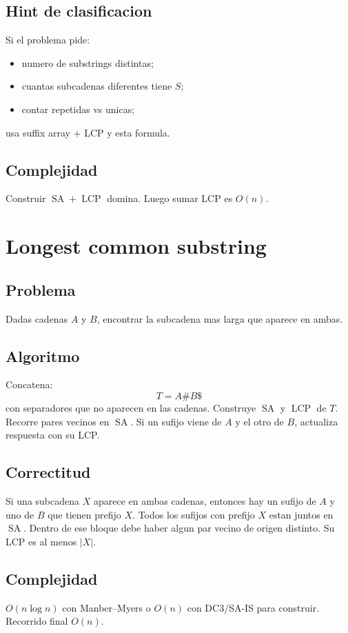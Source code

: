 \documentclass[10pt]{article}
\newcommand{\bigO}{O}
\newcommand{\SA}{\operatorname{SA}}
\newcommand{\LCP}{\operatorname{LCP}}
\begin{document}
\subsection{Hint de clasificacion}
Si el problema pide:
\begin{itemize}[leftmargin=*]
\item numero de substrings distintas;
\item cuantas subcadenas diferentes tiene $S$;
\item contar repetidas vs unicas;
\end{itemize}
usa suffix array + LCP y esta formula.

\subsection{Complejidad}
Construir $\SA+\LCP$ domina. Luego sumar LCP es $\bigO(n)$.

\newpage
\section{Longest common substring}

\subsection{Problema}
Dadas cadenas $A$ y $B$, encontrar la subcadena mas larga que aparece en ambas.

\subsection{Algoritmo}
Concatena:
\[
T=A\#B\$
\]
con separadores que no aparecen en las cadenas. Construye $\SA$ y $\LCP$ de $T$.
Recorre pares vecinos en $\SA$. Si un sufijo viene de $A$ y el otro de $B$,
actualiza respuesta con su LCP.

\subsection{Correctitud}
Si una subcadena $X$ aparece en ambas cadenas, entonces hay un sufijo de $A$ y
uno de $B$ que tienen prefijo $X$. Todos los sufijos con prefijo $X$ estan juntos
en $\SA$. Dentro de ese bloque debe haber algun par vecino de origen distinto.
Su LCP es al menos $|X|$.

\subsection{Complejidad}
$\bigO(n\log n)$ con Manber--Myers o $\bigO(n)$ con DC3/SA-IS para construir.
Recorrido final $\bigO(n)$.
\end{document}

